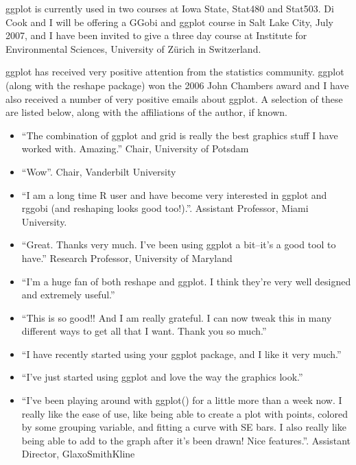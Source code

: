 \documentclass[oneside,letterpaper]{scrartcl}
\begin{document}
ggplot is currently used in two courses  at Iowa State, Stat480 and Stat503.  Di Cook and I will be offering a GGobi and ggplot course in Salt Lake City, July 2007, and I have been invited to give a three day course at Institute for Environmental Sciences, University of Zürich in Switzerland.
 
ggplot has received very positive attention from the statistics community. ggplot (along with the reshape package) won the 2006 John Chambers award and I have also received a number of very positive emails about ggplot.  A selection of these are listed below, along with the affiliations of the author, if known.

\begin{itemize}

	\item ``The combination of ggplot and grid is really the best graphics stuff I have worked with. Amazing.'' Chair, University of Potsdam

	\item ``Wow''.  Chair, Vanderbilt University

	\item ``I am a long time R user and have become very interested in ggplot and rggobi (and reshaping looks good too!).''.  Assistant Professor, Miami University.

	\item ``Great. Thanks very much. I've been using ggplot a bit--it's a good tool to have.'' Research Professor, University of Maryland

	\item ``I'm a huge fan of both reshape and ggplot.  I think they're very well designed and extremely useful.''

	\item ``This is so good!! And I am really grateful. I can now tweak this in many different ways to get all that I want. Thank you so much.''

	\item ``I have recently started using your ggplot package, and I like it very much.''

	\item ``I've just started using ggplot and love the way the graphics look.''

	\item ``I've been playing around with ggplot() for a little more than a week now.  I really like the ease of use, like being able to create a plot with points, colored by some grouping variable, and fitting a curve with SE bars.  I also really like being able to add to the graph after it's been drawn!  Nice features.''.  Assistant Director, GlaxoSmithKline


\end{itemize}
\end{document}
